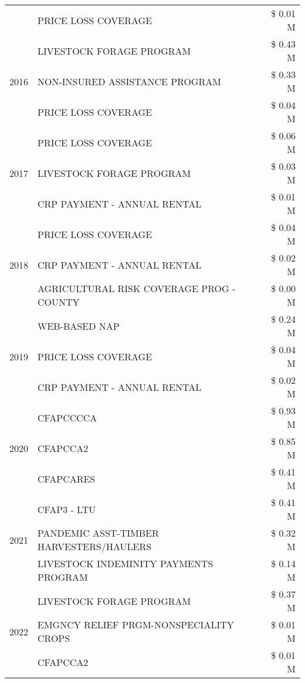\begin{tabular}{llr}
 & PRICE LOSS COVERAGE & \$ 0.01 M \\
\cline{1-3}
\multirow[t]{3}{*}{2016} & LIVESTOCK FORAGE PROGRAM & \$ 0.43 M \\
 & NON-INSURED ASSISTANCE PROGRAM & \$ 0.33 M \\
 & PRICE LOSS COVERAGE & \$ 0.04 M \\
\cline{1-3}
\multirow[t]{3}{*}{2017} & PRICE LOSS COVERAGE & \$ 0.06 M \\
 & LIVESTOCK FORAGE PROGRAM & \$ 0.03 M \\
 & CRP PAYMENT - ANNUAL RENTAL & \$ 0.01 M \\
\cline{1-3}
\multirow[t]{3}{*}{2018} & PRICE LOSS COVERAGE & \$ 0.04 M \\
 & CRP PAYMENT - ANNUAL RENTAL & \$ 0.02 M \\
 & AGRICULTURAL RISK COVERAGE PROG - COUNTY & \$ 0.00 M \\
\cline{1-3}
\multirow[t]{3}{*}{2019} & WEB-BASED NAP & \$ 0.24 M \\
 & PRICE LOSS COVERAGE & \$ 0.04 M \\
 & CRP PAYMENT - ANNUAL RENTAL & \$ 0.02 M \\
\cline{1-3}
\multirow[t]{3}{*}{2020} & CFAPCCCCA & \$ 0.93 M \\
 & CFAPCCA2 & \$ 0.85 M \\
 & CFAPCARES & \$ 0.41 M \\
\cline{1-3}
\multirow[t]{3}{*}{2021} & CFAP3 - LTU & \$ 0.41 M \\
 & PANDEMIC ASST-TIMBER HARVESTERS/HAULERS & \$ 0.32 M \\
 & LIVESTOCK INDEMINITY PAYMENTS PROGRAM & \$ 0.14 M \\
\cline{1-3}
\multirow[t]{3}{*}{2022} & LIVESTOCK FORAGE PROGRAM & \$ 0.37 M \\
 & EMGNCY RELIEF PRGM-NONSPECIALITY CROPS & \$ 0.01 M \\
 & CFAPCCA2 & \$ 0.01 M \\
\cline{1-3}
\bottomrule
\end{tabular}
